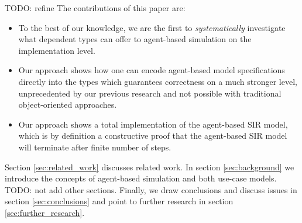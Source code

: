 TODO: refine
The contributions of this paper are:
\begin{itemize}
	\item To the best of our knowledge, we are the first to \textit{systematically} investigate what dependent types can offer to agent-based simulation on the implementation level.
	\item Our approach shows how one can encode agent-based model specifications directly into the types which guarantees correctness on a much stronger level, unprecedented by our previous research and not possible with traditional object-oriented approaches.
	\item Our approach shows a total implementation of the agent-based SIR model, which is by definition a constructive proof that the agent-based SIR model will terminate after finite number of steps.
\end{itemize}

Section \ref{sec:related_work} discusses related work. In section \ref{sec:background} we introduce the concepts of agent-based simulation and both use-case models. TODO: not add other sections. Finally, we draw conclusions and discuss issues in section \ref{sec:conclusions} and point to further research in section \ref{sec:further_research}.